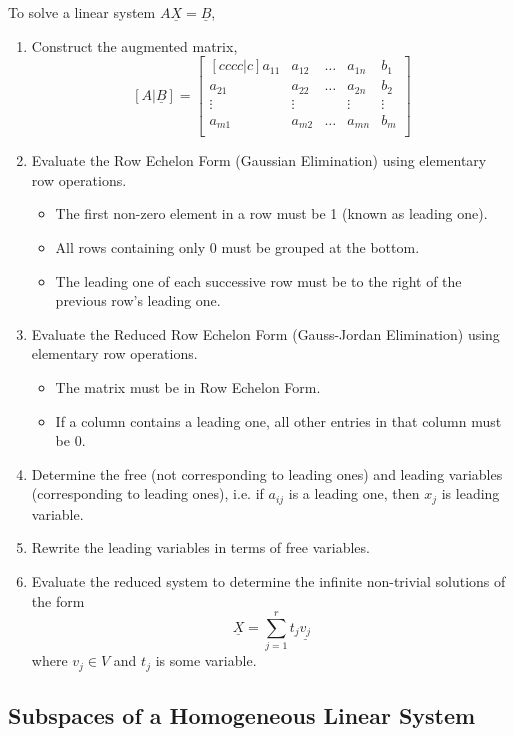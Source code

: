 \documentclass{article}
\begin{document}
To solve a linear system $A\underline{X}=\underline{B}$,
\begin{enumerate}
	\item Construct the augmented matrix, 
	$$ [A|\underline{B}] = \begin{bmatrix}[cccc|c]
		a_{11} & a_{12} & \dots & a_{1n} & b_1 \\
		a_{21} & a_{22} & \dots & a_{2n} & b_2 \\
		\vdots & \vdots &  & \vdots & \vdots \\
		a_{m1} & a_{m2} & \dots & a_{mn} & b_m \\
	\end{bmatrix}$$
	\item Evaluate the Row Echelon Form (Gaussian Elimination) using elementary row operations.
	\begin{itemize}
		\item The first non-zero element in a row must be 1 (known as leading one).
		\item All rows containing only 0 must be grouped at the bottom.
		\item The leading one of each successive row must be to the right of the previous row's leading one.
	\end{itemize}
	\item Evaluate the Reduced Row Echelon Form (Gauss-Jordan Elimination) using elementary row operations.
	\begin{itemize}
		\item The matrix must be in Row Echelon Form.
		\item If a column contains a leading one, all other entries in that column must be 0.
	\end{itemize}
	\item Determine the free (not corresponding to leading ones) and leading variables (corresponding to leading ones), i.e. if $a_{ij}$ is a leading one, then $x_j$ is leading variable.
	\item Rewrite the leading variables in terms of free variables.
	\item Evaluate the reduced system to determine the infinite non-trivial solutions of the form
	$$\underline{X} = \sum_{j = 1}^r t_j \underline{v_j}$$
	where $v_j \in V$ and $t_j$ is some variable.
\end{enumerate}

\subsection{Subspaces of a Homogeneous Linear System}
\end{document}
